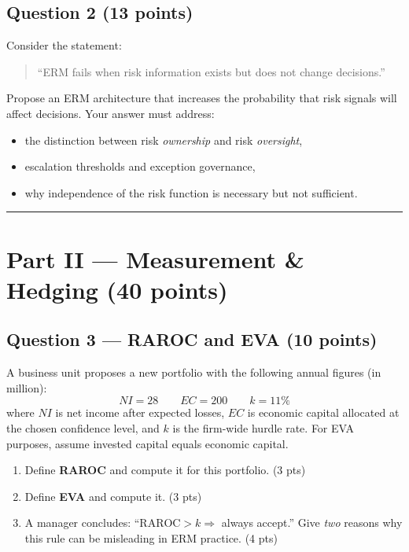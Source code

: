 \documentclass[11pt,a4paper]{article}
\begin{document}
\subsection*{Question 2 \hfill (13 points)}

Consider the statement:
\begin{quote}
``ERM fails when risk information exists but does not change decisions.''
\end{quote}

Propose an ERM architecture that increases the probability that risk signals will affect decisions.
Your answer must address:
\begin{itemize}
  \item[$\bullet$] the distinction between risk \emph{ownership} and risk \emph{oversight},
  \item[$\bullet$] escalation thresholds and exception governance,
  \item[$\bullet$] why independence of the risk function is necessary but not sufficient.
\end{itemize}

\vspace{2mm}
\hrule

\section*{Part II --- Measurement \& Hedging \hfill (40 points)}

\subsection*{Question 3 --- RAROC and EVA \hfill (10 points)}

A business unit proposes a new portfolio with the following annual figures (in \texteuro{} million):
\[
NI = 28 \qquad EC = 200 \qquad k = 11\%
\]
where $NI$ is net income after expected losses, $EC$ is economic capital allocated at the chosen
confidence level, and $k$ is the firm-wide hurdle rate.
For EVA purposes, assume invested capital equals economic capital.

\begin{enumerate}
  \item[(a)] Define \textbf{RAROC} and compute it for this portfolio. \hfill (3 pts)
  \item[(b)] Define \textbf{EVA} and compute it. \hfill (3 pts)
  \item[(c)] A manager concludes: ``$\text{RAROC} > k \Rightarrow$ always accept.''
  Give \emph{two} reasons why this rule can be misleading in ERM practice. \hfill (4 pts)
\end{enumerate}
\end{document}
